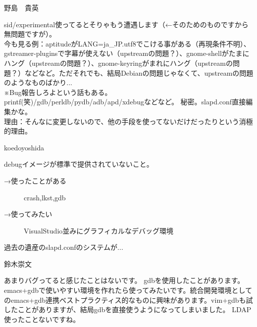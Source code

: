 \begin{prework}{ 野島　貴英 }

sid/experimental使ってるとそりゃもう遭遇します（←そのためのものですから無問題ですが）。\\
今も見る例：aptitudeがLANG=ja\_JP.utf8でこける事がある（再現条件不明）、gstreamer-pluginsで字幕が使えない（upstreamの問題？）、gnome-shellがたまにハング（upstreamの問題？）、gnome-keyringがまれにハング（upstreamの問題？）などなど。ただそれでも、結局Debianの問題じゃなくて、upstreamの問題のようなものばかり...\\
※Bug報告しろよという話もある。
printf(笑)/gdb/perldb/pydb/adb/apd/xdebugなどなど。
 秘密。slapd.conf直接編集かな。\\
理由：そんなに変更しないので、他の手段を使ってないだけだったりという消極的理由。
\end{prework}

\begin{prework}{ koedoyoshida }

debugイメージが標準で提供されていないこと。

\begin{description}
\item [→使ったことがある] crash,lkst,gdb
\item [→使ってみたい] VisualStudio並みにグラフィカルなデバッグ環境
\end{description}
過去の遺産のslapd.confのシステムが...
\end{prework}

\begin{prework}{ 鈴木崇文 }

あまりバグってると感じたことはないです。
 gdbを使用したことがあります。emacs+gdbで使いやすい環境を作れたら使ってみたいです。統合開発環境としてのemacs+gdb連携ベストプラクティス的なものに興味があります。vim+gdbも試したことがありますが、結局gdbを直接使うようになってしまいました。
LDAP使ったことないですね。
\end{prework}
